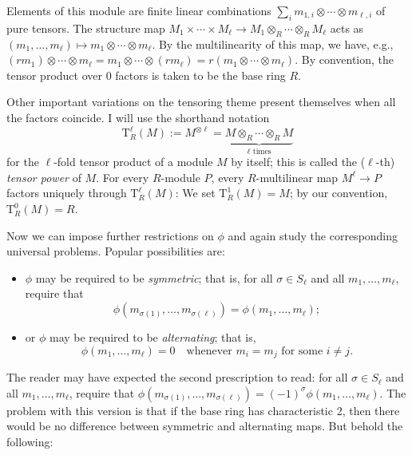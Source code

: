 Elements of this module are finite linear combinations
$\sum_i m_{1,i} \otimes \cdots \otimes m_{\ell,i}$ of pure tensors.
The structure map
$M_1 \times \cdots \times M_\ell \to M_1 \otimes_R \cdots \otimes_R
M_\ell$ acts as
$(m_1, \dots, m_\ell) \mapsto m_1 \otimes \cdots \otimes m_\ell$. By
the multilinearity of this map, we have, e.g.,
$(rm_1) \otimes \cdots \otimes m_\ell = m_1 \otimes \cdots \otimes
(rm_\ell) = r(m_1 \otimes \cdots \otimes m_\ell)$.  By convention, the
tensor product over $0$ factors is taken to be the base ring $R$.

Other important variations on the tensoring theme present themselves
when all the factors coincide. I will use the shorthand notation
\[
  \mathrm{T}^\ell_R(M) := M^{\otimes \ell} = \underbrace{M \otimes_R
    \cdots \otimes_R M}_{\ell \text{ times}}
\]
for the $\ell$-fold tensor product of a module $M$ by itself; this is
called the ($\ell$-th) \emph{tensor power} of $M$. For every
$R$-module $P$, every $R$-multilinear map $M^\ell \to P$ factors
uniquely through $\mathrm{T}^\ell_R(M)$: We set
$\mathrm{T}^1_R(M) = M$; by our convention, $\mathrm{T}^0_R(M) = R$.

Now we can impose further restrictions on $\phi$ and again study the
corresponding universal problems. Popular possibilities are:
\begin{itemize}
\item $\phi$ may be required to be \emph{symmetric}; that is, for all
  $\sigma \in S_\ell$ and all $m_1, \dots, m_\ell$, require that
  \[
    \phi(m_{\sigma(1)}, \dots, m_{\sigma(\ell)}) = \phi(m_1, \dots,
    m_\ell);
  \]
\item or $\phi$ may be required to be \emph{alternating}; that is,
  \[
    \phi(m_1, \dots, m_\ell) = 0 \quad \text{whenever } m_i = m_j
    \text{ for some } i \neq j.
  \]
\end{itemize}
The reader may have expected the second prescription to read: for all
$\sigma \in S_\ell$ and all $m_1, \dots, m_\ell$, require that
$\phi(m_{\sigma(1)}, \dots, m_{\sigma(\ell)}) = (-1)^\sigma \phi(m_1,
\dots, m_\ell)$. The problem with this version is that if the base
ring has characteristic 2, then there would be no difference between
symmetric and alternating maps. But behold the following:

